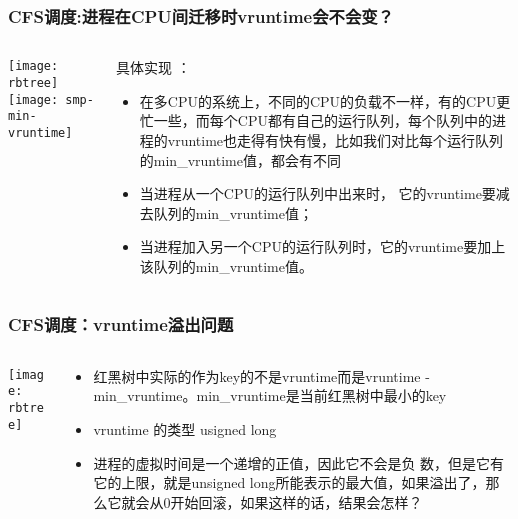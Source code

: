 \begin{frame}
	\frametitle{CFS调度:进程在CPU间迁移时vruntime会不会变？}
	\begin{columns}
		\begin{column}{.4\textwidth}
			\Large \centering
			
			\texttt{[image: rbtree]}
			\texttt{[image: smp-min-vruntime]}
		\end{column} \pause
		
		\begin{column}{.6\textwidth}
			
			具体实现 ：
			\begin{itemize}
				\item 在多CPU的系统上，不同的CPU的负载不一样，有的CPU更忙一些，而每个CPU都有自己的运行队列，每个队列中的进程的vruntime也走得有快有慢，比如我们对比每个运行队列的min\_vruntime值，都会有不同
				\pause
				\item 当进程从一个CPU的运行队列中出来时， 它的vruntime要减去队列的min\_vruntime值；
				\item 当进程加入另一个CPU的运行队列时，它的vruntime要加上该队列的min\_vruntime值。
			\end{itemize}
			\centering
		\end{column}
	\end{columns}
\end{frame}


\begin{frame}
	\frametitle{CFS调度：vruntime溢出问题}
	\begin{columns}
		\begin{column}{.4\textwidth}
			\Large \centering
			
			\texttt{[image: rbtree]}
		\end{column}
		
		\begin{column}{.6\textwidth}
			
			\begin{itemize}
				\item 红黑树中实际的作为key的不是vruntime而是vruntime - min\_vruntime。min\_vruntime是当前红黑树中最小的key
				\item vruntime 的类型 usigned long
				\item 进程的虚拟时间是一个递增的正值，因此它不会是负 数，但是它有它的上限，就是unsigned long所能表示的最大值，如果溢出了，那么它就会从0开始回滚，如果这样的话，结果会怎样？
			\end{itemize}
			\centering

		\end{column}
	\end{columns}
\end{frame}


